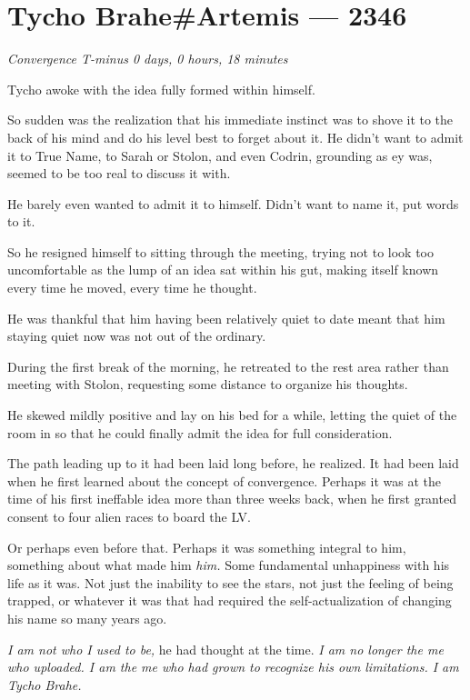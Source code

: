 \hypertarget{tycho-braheartemis-2346}{%
\chapter{Tycho Brahe\#Artemis — 2346}}

\begin{center}
\emph{Convergence T-minus 0 days, 0 hours, 18 minutes}
\end{center}

\noindent Tycho awoke with the idea fully formed within himself.

So sudden was the realization that his immediate instinct was to shove it to the back of his mind and do his level best to forget about it. He didn't want to admit it to True Name, to Sarah or Stolon, and even Codrin, grounding as ey was, seemed to be too real to discuss it with.

He barely even wanted to admit it to himself. Didn't want to name it, put words to it.

So he resigned himself to sitting through the meeting, trying not to look too uncomfortable as the lump of an idea sat within his gut, making itself known every time he moved, every time he thought.

He was thankful that him having been relatively quiet to date meant that him staying quiet now was not out of the ordinary.

During the first break of the morning, he retreated to the rest area rather than meeting with Stolon, requesting some distance to organize his thoughts.

He skewed mildly positive and lay on his bed for a while, letting the quiet of the room in so that he could finally admit the idea for full consideration.

The path leading up to it had been laid long before, he realized. It had been laid when he first learned about the concept of convergence. Perhaps it was at the time of his first ineffable idea more than three weeks back, when he first granted consent to four alien races to board the LV.

Or perhaps even before that. Perhaps it was something integral to him, something about what made him \emph{him.} Some fundamental unhappiness with his life as it was. Not just the inability to see the stars, not just the feeling of being trapped, or whatever it was that had required the self-actualization of changing his name so many years ago.

\emph{I am not who I used to be,} he had thought at the time. \emph{I am no longer the me who uploaded. I am the me who had grown to recognize his own limitations. I am Tycho Brahe.}

